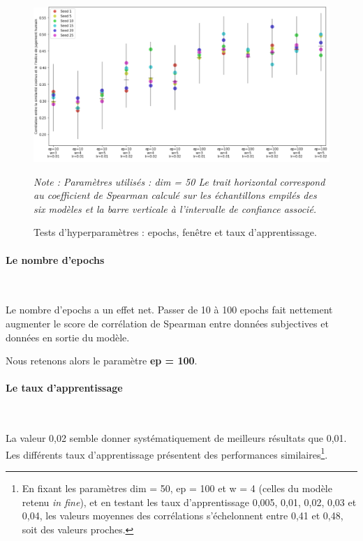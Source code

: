 \documentclass[11pt,french,french]{article}
\let\rmarkdownfootnote\footnote%
\def\footnote{\protect\rmarkdownfootnote}
\begin{document}
\begin{figure}[htp]
\begin{center}
\includegraphics[width=1\textwidth]{img/test_parametres.png}
\captionsetup{margin=0cm,format=hang,justification=justified}
\caption{Tests d'hyperparamètres : epochs, fenêtre et taux d'apprentissage.}\label{fig:evaluation_1}
\end{center}
\vspace{-0.3cm}
\footnotesize
\emph{Note : Paramètres utilisés : dim = 50\newline
Le trait horizontal correspond au coefficient de Spearman calculé sur les échantillons empilés des six modèles et la barre verticale à l'intervalle de confiance associé.}
\end{figure}

\paragraph{Le nombre d'epochs}\label{le-nombre-depochs}

~

Le nombre d'epochs a un effet net. Passer de 10 à 100 epochs fait
nettement augmenter le score de corrélation de Spearman entre données
subjectives et données en sortie du modèle.

\faArrowCircleRight{} Nous retenons alors le paramètre \textbf{ep =
100}.

\paragraph{Le taux d'apprentissage}\label{le-taux-dapprentissage}

~

La valeur 0,02 semble donner systématiquement de meilleurs résultats que
0,01. Les différents taux d'apprentissage présentent des performances
similaires\footnote{En fixant les paramètres dim = 50, ep = 100 et w = 4
  (celles du modèle retenu \emph{in fine}), et en testant les taux
  d'apprentissage 0,005, 0,01, 0,02, 0,03 et 0,04, les valeurs moyennes
  des corrélations s'échelonnent entre 0,41 et 0,48, soit des valeurs
  proches.}.
\end{document}
